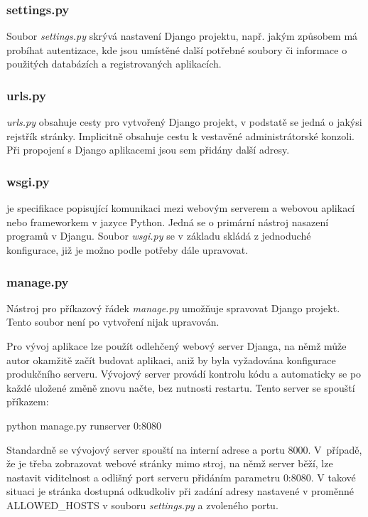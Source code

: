 \subsubsection{settings.py}
\label{settings}
Soubor \textit{settings.py} skrývá nastavení Django projektu,
např. jakým způsobem má probíhat autentizace, kde jsou umístěné další
potřebné soubory či informace o použitých databázích a registrovaných
aplikacích.

\subsubsection{urls.py}
\textit{urls.py} obsahuje  cesty pro vytvořený Django projekt,
v podstatě se jedná o jakýsi rejstřík stránky. Implicitně obsahuje
cestu k vestavěné administrátorské konzoli. Při propojení s Django
aplikacemi jsou sem přidány další  adresy.

\subsubsection{wsgi.py}
 je specifikace popisující komunikaci mezi webovým serverem a
webovou aplikací nebo frameworkem v jazyce Python. Jedná se o primární
nástroj nasazení programů v Djangu. Soubor \textit{wsgi.py} se v
základu skládá z jednoduché  konfigurace, již je možno podle
potřeby dále upravovat.

\subsubsection{manage.py}
Nástroj pro příkazový řádek \textit{manage.py} umožňuje spravovat
Django projekt. Tento soubor není po vytvoření nijak upravován.

Pro vývoj aplikace lze použít odlehčený webový server Djanga, na němž
může autor okamžitě začít budovat aplikaci, aniž by byla vyžadována
konfigurace produkčního serveru. Vývojový server provádí kontrolu kódu
a automaticky se po každé uložené změně znovu načte, bez nutnosti
restartu. Tento server se spouští příkazem:

\begin{center}
\textsf{python manage.py runserver 0:8080}
\end{center}

Standardně se vývojový server spouští na interní  adrese a
portu 8000. V~případě, že je třeba zobrazovat webové stránky mimo
stroj, na němž server běží, lze nastavit viditelnost a odlišný port
serveru přidáním parametru \textsf{0:8080}. V takové situaci je
stránka dostupná odkudkoliv při zadání adresy nastavené v proměnné
\textsf{ALLOWED\_HOSTS} v souboru \textit{settings.py} a zvoleného
portu.

